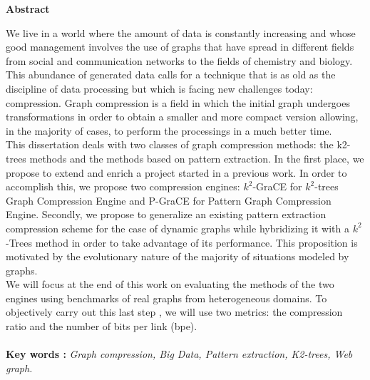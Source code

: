 \newpage
\thispagestyle{plain}
\begin{center}
	\par
	\textbf{
		\vskip 0.5in
		\LARGE 
			Abstract \\[0.15in]
	}
\end{center}
	\par
    
    We live in a world where the amount of data is constantly increasing and whose good management involves the use of graphs that have spread in different fields from social and communication networks to the fields of chemistry and biology. This abundance of generated data calls for a technique that is as old as the discipline of data processing but which is facing new challenges today: compression. Graph compression is a field in which the initial graph undergoes transformations in order to obtain a smaller and more compact version allowing, in the majority of cases, to perform the processings in a much better time.\\

 This dissertation deals with two classes of graph compression methods: the k2-trees methods and the methods based on pattern extraction. In the first place, we propose to extend and enrich a project started in a previous work. In order to accomplish this, we propose two compression engines: $k^2$-GraCE for $k^2$-trees Graph Compression Engine and P-GraCE for Pattern Graph Compression Engine. Secondly, we propose to generalize an existing pattern extraction compression scheme for the case of dynamic graphs while hybridizing it with a $k^2$-Trees method in order to take advantage of its performance. This proposition is motivated by the evolutionary nature of the majority of situations modeled by graphs.\\
 
 We will focus at the end of this work on evaluating the methods of the two engines using benchmarks of real graphs from heterogeneous domains. To objectively carry out this last step , we will use two metrics: the compression ratio and the number of bits per link (bpe). \\\\\textbf{Key words :} \textit{Graph compression, Big Data, Pattern extraction, K2-trees, Web graph.}

\newpage
 

